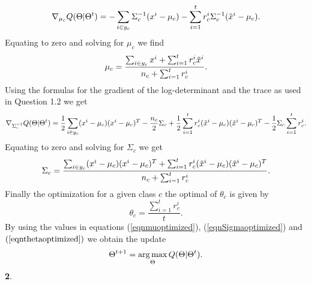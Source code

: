 \documentclass{article}
\begin{document}
\begin{equation*}
\nabla_{\mu_{c}}Q(\Theta|\Theta^{t})=-\sum_{i\in y_{c}}\Sigma_{c}^{-1}(x^{i}-\mu_{c})-\sum_{i=1}^{t}r^{i}_{c}\Sigma_{c}^{-1}(\tilde{x}^{i}-\mu_{c}).
\end{equation*}
Equating to zero and solving for $\mu_{c}$ we find
\begin{equation}\label{eqnmuoptimized}
\mu_{c}=\frac{\sum_{i\in y_{c}}x^{i}+\sum_{i=1}^{t}r^{i}_{c}\tilde{x}^{i}}{n_{c}+\sum_{i=1}^{t}r^{i}_{c}}.
\end{equation}
Using the formulas for the gradient of the log-determinant and the trace as used in Question 1.2 we get
\begin{equation*}
\nabla_{\Sigma_{c}^{-1}}Q(\Theta|\Theta^{t})=\frac{1}{2}\sum_{i\in y_{c}}(x^{i}-\mu_{c})(x^{i}-\mu_{c})^{T}-\frac{n_{c}}{2}\Sigma_{c}+
\frac{1}{2}\sum_{i=1}^{t}r^{i}_{c}(\tilde{x}^{i}-\mu_{c})(\tilde{x}^{i}-\mu_{c})^{T}-\frac{1}{2}\Sigma_{c}\sum_{i=1}^{t}r^{i}_{c}.
\end{equation*}
Equating to zero and solving for $\Sigma_{c}$ we get
\begin{equation}\label{eqnSigmaoptimized}
\Sigma_{c}=\frac{\sum_{i\in y_{c}}(x^{i}-\mu_{c})(x^{i}-\mu_{c})^{T}+\sum_{i=1}^{t}r^{i}_{c}(\tilde{x}^{i}-\mu_{c})(\tilde{x}^{i}-\mu_{c})^{T}}{n_{c}+\sum_{i=1}^{t}r^{i}_{c}}.
\end{equation}
Finally the optimization for a given class $c$  the optimal of  $\theta_{c}$ is given by
\begin{equation}\label{eqnthetaoptimized}
\theta_{c}=\frac{\sum_{i=1}^{t}r^{i}_{c}}{t}.
\end{equation}
By using the values in equations (\ref{eqnmuoptimized}), (\ref{eqnSigmaoptimized}) and $(\ref{eqnthetaoptimized})$  we obtain the update
\begin{equation*}
\Theta^{t+1}=\mathop{\rm arg\,max}_{\Theta}Q(\Theta|\Theta^{t}).
\end{equation*}
\newline
\textbf{2}.
\end{document}
